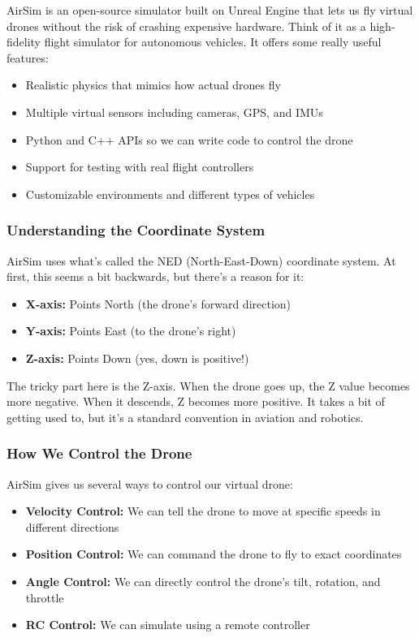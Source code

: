 AirSim is an open-source simulator built on Unreal Engine that lets us fly virtual drones without the risk of crashing expensive hardware. Think of it as a high-fidelity flight simulator for autonomous vehicles. It offers some really useful features:
\begin{itemize}
	\item Realistic physics that mimics how actual drones fly
	\item Multiple virtual sensors including cameras, GPS, and IMUs
	\item Python and C++ APIs so we can write code to control the drone
	\item Support for testing with real flight controllers
	\item Customizable environments and different types of vehicles
\end{itemize}

\subsubsection{Understanding the Coordinate System}

AirSim uses what's called the NED (North-East-Down) coordinate system. At first, this seems a bit backwards, but there's a reason for it:
\begin{itemize}
	\item \textbf{X-axis:} Points North (the drone's forward direction)
	\item \textbf{Y-axis:} Points East (to the drone's right)
	\item \textbf{Z-axis:} Points Down (yes, down is positive!)
\end{itemize}

The tricky part here is the Z-axis. When the drone goes up, the Z value becomes more negative. When it descends, Z becomes more positive. It takes a bit of getting used to, but it's a standard convention in aviation and robotics.

\subsubsection{How We Control the Drone}

AirSim gives us several ways to control our virtual drone:
\begin{itemize}
	\item \textbf{Velocity Control:} We can tell the drone to move at specific speeds in different directions
	\item \textbf{Position Control:} We can command the drone to fly to exact coordinates
	\item \textbf{Angle Control:} We can directly control the drone's tilt, rotation, and throttle
	\item \textbf{RC Control:} We can simulate using a remote controller
\end{itemize}

